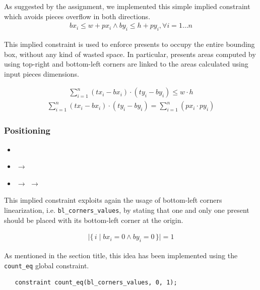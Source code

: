 \documentclass[a4paper,10pt]{article}
\newcommand{\xmark}{\ding{55}}%
\newcounter{subsubsubsection}[subsubsection]
\begin{document}
As suggested by the assignment, we implemented this simple implied constraint which avoids pieces overflow in both directions.
\begin{gather*}
   bx_{i} \leq w + px_{i} \wedge by_{i} \leq h + py_{i}, \forall{i = 1 \dots n}
\end{gather*}

 \label{sec:areas-summation}
This implied constraint is used to enforce presents to occupy the entire bounding box, without any kind of wasted space.
In particular, presents areas computed by using top-right and bottom-left corners are linked to the areas calculated using input pieces dimensions.

\begin{gather*}
   \sum_{i=1}^{n} (tx_{i} - bx_{i}) \cdot (ty_{i} - by_{i}) \leq w \cdot h
\end{gather*}
\begin{gather*}
   \sum_{i=1}^{n} (tx_{i} - bx_{i}) \cdot (ty_{i} - by_{i}) = \sum_{i=1}^{n} (px_{i} \cdot py_{i}) 
\end{gather*}

\subsubsection{Positioning}
\begin{itemize}
   \item {}
   \item {} $\rightarrow$ \xmark
   \item {} $\rightarrow$ $\rightarrow$ \xmark
\end{itemize}

 \label{sec:present-at-origin}
This implied constraint exploits again the usage of bottom-left corners linearization, i.e. \texttt{bl\_corners\_values},
by stating that one and only one present should be placed with its bottom-left corner at the origin.

\begin{gather*}
   \lvert\{\,i \mid bx_{i} = 0 \wedge by_{i} = 0\,\}\rvert = 1
\end{gather*}

As mentioned in the section title, this idea has been implemented using the \texttt{count\_eq} global constraint.

\begin{verbatim}
   constraint count_eq(bl_corners_values, 0, 1);
\end{verbatim}
\end{document}
